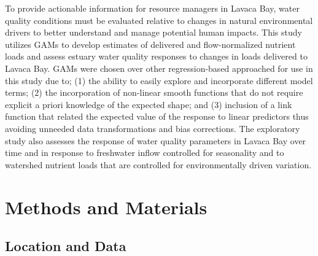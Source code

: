 \documentclass[fleqn,10pt,lineno]{wlpeerj} %
\begin{document}
To provide actionable information for resource managers in Lavaca Bay,
water quality conditions must be evaluated relative to changes in
natural environmental drivers to better understand and manage potential
human impacts. This study utilizes GAMs to develop estimates of
delivered and flow-normalized nutrient loads and assess estuary water
quality responses to changes in loads delivered to Lavaca Bay. GAMs were
chosen over other regression-based approached for use in this study due
to; (1) the ability to easily explore and incorporate different model
terms; (2) the incorporation of non-linear smooth functions that do not
require explicit a priori knowledge of the expected shape; and (3)
inclusion of a link function that related the expected value of the
response to linear predictors thus avoiding unneeded data
transformations and bias corrections. The exploratory study also
assesses the response of water quality parameters in Lavaca Bay over
time and in response to freshwater inflow controlled for seasonality and
to watershed nutrient loads that are controlled for environmentally
driven variation.

\hypertarget{methods-and-materials}{%
\section*{Methods and Materials}\label{methods-and-materials}}

\hypertarget{location-and-data}{%
\subsection*{Location and Data}\label{location-and-data}}
\end{document}
